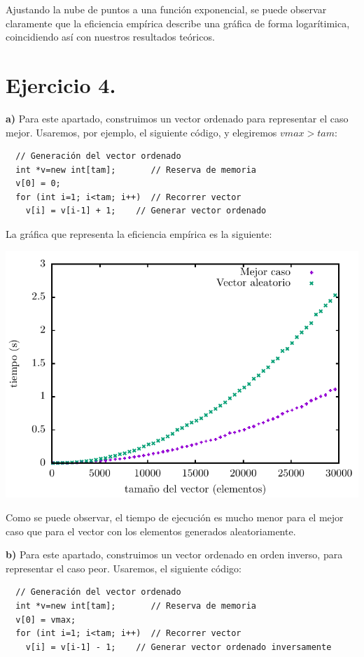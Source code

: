 \documentclass[11pt,a4paper]{article}
\begin{document}
Ajustando la nube de puntos a una función exponencial, se puede observar claramente que la eficiencia empírica describe una gráfica de forma logarítimica, coincidiendo así con nuestros resultados teóricos.

\section*{Ejercicio 4.}

\textbf{a)} Para este apartado, construimos un vector ordenado para representar el caso mejor. Usaremos, por ejemplo, el siguiente código, y elegiremos $vmax > tam$:

\begin{lstlisting}
  // Generación del vector ordenado
  int *v=new int[tam];       // Reserva de memoria
  v[0] = 0;
  for (int i=1; i<tam; i++)  // Recorrer vector
    v[i] = v[i-1] + 1;    // Generar vector ordenado
\end{lstlisting}

La gráfica que representa la eficiencia empírica es la siguiente:

\begin{center}
	\includegraphics{img/tiempos_burbuja_mejor_caso.pdf}
\end{center}

Como se puede observar, el tiempo de ejecución es mucho menor para el mejor caso que para el vector con los elementos generados aleatoriamente.

\textbf{b)} Para este apartado, construimos un vector ordenado en orden inverso, para representar el caso peor. Usaremos, el siguiente código:

\begin{lstlisting}
  // Generación del vector ordenado
  int *v=new int[tam];       // Reserva de memoria
  v[0] = vmax;
  for (int i=1; i<tam; i++)  // Recorrer vector
    v[i] = v[i-1] - 1;    // Generar vector ordenado inversamente
\end{lstlisting}
\end{document}
